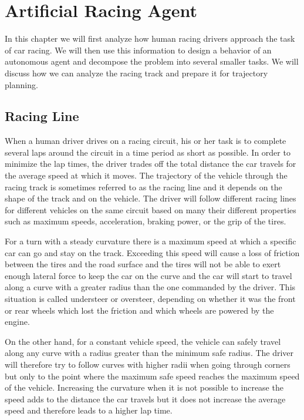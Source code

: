 \chapter{Artificial Racing Agent}

In this chapter we will first analyze how human racing drivers approach the task of car racing. We will then use this information to design a behavior of an autonomous agent and decompose the problem into several smaller tasks. We will discuss how we can analyze the racing track and prepare it for trajectory planning.

\section{Racing Line}

When a human driver drives on a racing circuit, his or her task is to complete several laps around the circuit in a time period as short as possible. In order to minimize the lap times, the driver trades off the total distance the car travels for the average speed at which it moves. The trajectory of the vehicle through the racing track is sometimes referred to as the racing line and it depends on the shape of the track and on the vehicle. The driver will follow different racing lines for different vehicles on the same circuit based on many their different properties such as maximum speeds, acceleration, braking power, or the grip of the tires.

For a turn with a steady curvature there is a maximum speed at which a specific car can go and stay on the track. Exceeding this speed will cause a loss of friction between the tires and the road surface and the tires will not be able to exert enough lateral force to keep the car on the curve and the car will start to travel along a curve with a greater radius than the one commanded by the driver. This situation is called understeer or oversteer, depending on whether it was the front or rear wheels which lost the friction and which wheels are powered by the engine.


On the other hand, for a constant vehicle speed, the vehicle can safely travel along any curve with a radius greater than the minimum safe radius. The driver will therefore try to follow curves with higher radii when going through corners but only to the point where the maximum safe speed reaches the maximum speed of the vehicle. Increasing the curvature when it is not possible to increase the speed adds to the distance the car travels but it does not increase the average speed and therefore leads to a higher lap time.

